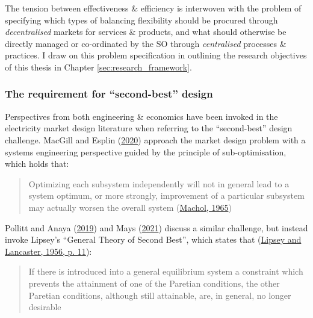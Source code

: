 \documentclass[12pt,a4paper,]{report}
\begin{document}
The tension between effectiveness \& efficiency is interwoven with the
problem of specifying which types of balancing flexibility should be
procured through \emph{decentralised} markets for services \& products,
and what should otherwise be directly managed or co-ordinated by the SO
through \emph{centralised} processes \& practices. I draw on this
problem specification in outlining the research objectives of this
thesis in Chapter \ref{sec:research_framework}.

\hypertarget{sec:lit_review-design-challenges-secondbest}{%
\subsubsection{The requirement for ``second-best''
design}\label{sec:lit_review-design-challenges-secondbest}}

Perspectives from both engineering \& economics have been invoked in the
electricity market design literature when referring to the
``second-best'' design challenge. MacGill and Esplin
(\protect\hyperlink{ref-macgillEndtoendElectricityMarket2020}{2020})
approach the market design problem with a systems engineering
perspective guided by the principle of sub-optimisation, which holds
that:

\begin{quote}
Optimizing each subsystem independently will not in general lead to a
system optimum, or more strongly, improvement of a particular subsystem
may actually worsen the overall system
(\protect\hyperlink{ref-machol1965system}{Machol, 1965})
\end{quote}

Pollitt and Anaya
(\protect\hyperlink{ref-pollittCompetitionMarketsAncillary2019}{2019})
and Mays
(\protect\hyperlink{ref-maysMissingIncentivesFlexibility2021}{2021})
discuss a similar challenge, but instead invoke Lipsey's ``General
Theory of Second Best'', which states that
(\protect\hyperlink{ref-lipseyGeneralTheorySecond1956}{Lipsey and
Lancaster, 1956, p. 11}):

\begin{quote}
If there is introduced into a general equilibrium system a constraint
which prevents the attainment of one of the Paretian conditions, the
other Paretian conditions, although still attainable, are, in general,
no longer desirable
\end{quote}
\end{document}

